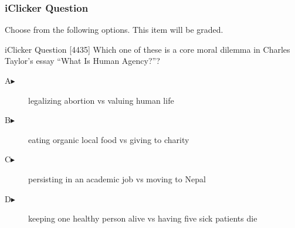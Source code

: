 \begin{frame}
  \frametitle{iClicker Question}
Choose from the following options. This item will be graded.
\begin{block}{iClicker Question}
[4435] Which one of these is a core moral dilemma in Charles Taylor's essay
``What Is Human Agency?''?
\end{block}
\begin{description}
\item[A\hspace{.2in}$\blacktriangleright$] legalizing abortion vs valuing human life
\item[B\hspace{.2in}$\blacktriangleright$] eating organic local food vs giving to charity
\item[C\hspace{.2in}$\blacktriangleright$] persisting in an academic job vs moving to Nepal
\item[D\hspace{.2in}$\blacktriangleright$] keeping one healthy person alive vs having five sick patients die
\end{description}
\end{frame}
